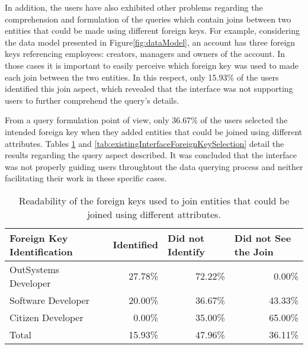 In addition, the users have also exhibited other problems regarding the comprehension and formulation of the queries which contain joins between two entities that could be made using different foreign keys. For example, considering the data model presented in  Figure\ref{fig:dataModel}, an account has three foreign keys referencing employees: creators, managers and owners of the account. In those cases it is important to easily perceive which foreign key was used to made each join between the two entities. In this respect, only 15.93\% of the users identified this join aspect, which revealed that the interface was not supporting users to further comprehend the query's details. 

From a query formulation point of view, only 36.67\% of the users selected the intended foreign key when they added entities that could be joined using different attributes. Tables \ref{tab:existingInterfaceForeignKeyIdentification} and \ref{tab:existingInterfaceForeignKeySelection} detail the results regarding the query aspect described. It was concluded that the interface was not properly guiding users throughtout the data querying process and neither facilitating their work in these specific cases.

\begin{table}[tb]
    \caption{Readability of the foreign keys used to join entities that could be joined using different attributes.}
    \label{tab:existingInterfaceForeignKeyIdentification}
    \begin{tabular}{@{}lrrr@{}}
    \toprule
    \textbf{Foreign Key Identification} & \multicolumn{1}{l}{Identified} & \multicolumn{1}{l}{Did not Identify} & \multicolumn{1}{l}{Did not See the Join} \\ \midrule
    OutSystems Developer                & 27.78\%                        & 72.22\%                              & 0.00\%                                   \\
    Software Developer                  & 20.00\%                        & 36.67\%                              & 43.33\%                                  \\
    Citizen Developer                   & 0.00\%                         & 35.00\%                              & 65.00\%                                  \\
    Total                               & 15.93\%                        & 47.96\%                              & 36.11\%                                  \\ \bottomrule
    \end{tabular}
    \end{table}


